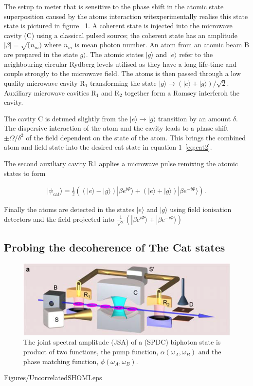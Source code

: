 \documentclass[aps,prl,twocolumn,amsmath,amssymb]{revtex4}
\begin{document}
The setup to meter that is sensitive to the phase shift in the atomic state superposition caused by the atoms interaction witexperimentally realise this state state is pictured in figure ~\ref{fig:Setup}. A coherent state is injected into the microwave cavity (C) using a classical pulsed source; the coherent state has an amplitude $|\beta| = \sqrt(n_{m})$ where $n_{m}$ is mean photon number. An atom from an atomic beam B are prepared in the state $g\rangle$. The atomic states $|g\rangle$ and $|e\rangle$ refer to the neighbouring circular Rydberg levels utilised as they have a long life-time and couple strongly to the microwave field.  The atoms is then passed through a low quality microwave cavity $\mathrm{R_{1}}$ transforming the state $|g\rangle \rightarrow  (|e\rangle+|g\rangle)/\sqrt{2}$. Auxiliary microwave cavities $\mathrm{R_{1}}$ and $\mathrm{R_{2}}$ together form a Ramsey interferoh the cavity. 

The cavity C is detuned slightly from the $|e\rangle \rightarrow |g\rangle$ transition by an amount $\delta$.  The dispersive interaction of the atom and the cavity leads to a phase shift $\pm\Omega/\delta^2$ of the field dependent on the state of the atom. This brings the combined atom and field state into the desired cat state in equation 1~\ref{eq:cat2}.

The second auxiliary cavity R1 applies a microwave pulse %
remixing the atomic states to form 

\begin{align}
|\psi_{\mathrm{cat}}\rangle = \frac{1}{2} ((|e\rangle-|g\rangle)|\beta e^{i\Phi}\rangle+(|e\rangle+|g\rangle)|\beta e^{-i\Phi}\rangle)
\label{eq:cat3}.
\end{align}

Finally the atoms are detected in the states $|e\rangle$ and $|g\rangle$ using field ionisation detectors and the field projected into  $\frac{1}{\sqrt{2}} (|\beta e^{i\Phi}\rangle \pm|\beta e^{-i\Phi}\rangle)$

\subsection{\label{sec:level1}Probing the decoherence of The Cat states}




\begin{figure}
  \centering
  \includegraphics[width=.8\linewidth]{Figures/fig_ramsey_interf.png}
\caption{The joint spectral amplitude (JSA) of a (SPDC) biphoton state is product of two functions, the pump function, $\alpha(\omega_A,\omega_B)$ and the phase matching function, $\phi(\omega_A,\omega_B)$.}
\label{fig:Setup}
\end{figure}
Figures/UncorrelatedSHOMI.eps
\end{document}
